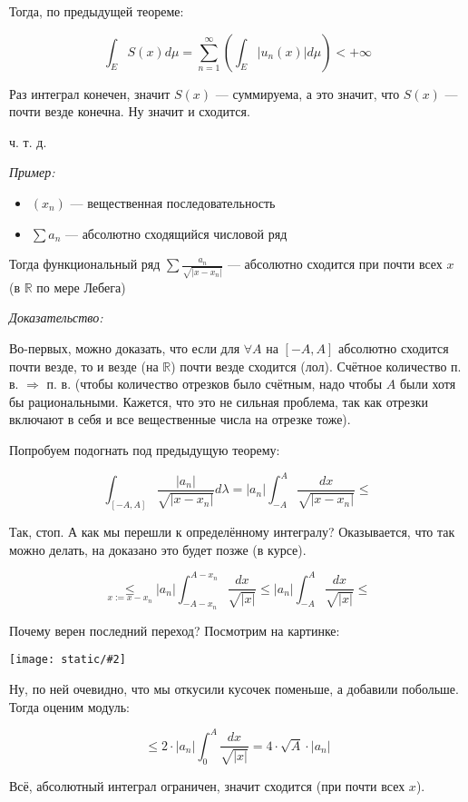 \documentclass{article}
\def\images#1#2{\begin{center}\texttt{[image: static/\#2]}\end{center}}
\begin{document}
Тогда, по предыдущей теореме: 

\[\int_{E} S(x) d\mu = \sum_{n = 1}^{\infty} \left(\int_{E} |u_n(x)| d\mu\right) < +\infty\]

Раз интеграл конечен, значит $S(x)$ --- суммируема, а это значит, что $S(x)$ --- почти везде конечна. Ну значит и сходится.

ч. т. д.

\textit{Пример: }

\begin{itemize}
    \item $(x_n)$ --- вещественная последовательность
    \item $\sum a_n$ --- абсолютно сходящийся числовой ряд
\end{itemize}

Тогда функциональный ряд $\sum \frac{a_n}{\sqrt{|x - x_n|}}$  --- абсолютно сходится при почти всех $x$ (в $\mathbb{R}$ по мере Лебега)

\textit{Доказательство: }

Во-первых, можно доказать, что если для $\forall A$ на $[-A, A]$ абсолютно сходится почти везде, то и везде (на $\mathbb{R}$) почти везде сходится (лол). Счётное количество п. в. $\Rightarrow$ п. в. (чтобы количество отрезков было счётным, надо чтобы $A$ были хотя бы рациональными. Кажется, что это не сильная проблема, так как отрезки включают в себя и все вещественные числа на отрезке тоже).

Попробуем подогнать под предыдущую теорему: 

\[\int_{[-A, A]}\frac{|a_n|}{\sqrt{|x - x_n|}} d\lambda = |a_n| \int_{-A}^{A} \frac{dx}{\sqrt{|x - x_n|}} \le\]

Так, стоп. А как мы перешли к определённому интегралу? Оказывается, что так можно делать, на доказано это будет позже (в курсе).

\[\underset{x := x - x_n}{\le} |a_n| \int_{-A - x_n}^{A - x_n} \frac{dx}{\sqrt{|x|}} \le |a_n| \int_{-A}^{A} \frac{dx}{\sqrt{|x|}} \le\]

Почему верен последний переход? Посмотрим на картинке: 

\images{0.5}{sh_pol_r.png}

Ну, по ней очевидно, что мы откусили кусочек поменьше, а добавили побольше. Тогда оценим модуль: 

\[ \le 2 \cdot |a_n| \int_{0}^{A}\frac{dx}{\sqrt{|x|}} = 4 \cdot \sqrt{A} \cdot |a_n|\]

Всё, абсолютный интеграл ограничен, значит сходится (при почти всех $x$).
\end{document}
